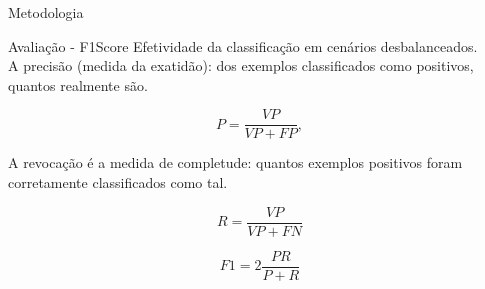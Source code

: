 \documentclass{beamer}
\begin{document}
\begin{frame}{Metodologia}
\begin{block}{Avaliação - F1Score}
\justifying
Efetividade da classificação em cenários desbalanceados. 
\\

A precisão (medida da exatidão): dos exemplos classificados como positivos, quantos realmente são.

\begin{equation}
  P = \frac{VP}{VP + FP},
  \label{precisao}
\end{equation}

A revocação é a medida de completude: quantos exemplos positivos foram corretamente classificados como tal. 

\begin{equation}
  R = \frac{VP}{VP + FN}
  \label{revocacao}
\end{equation}

\begin{equation}
  F1 = 2 \frac{PR}{P+R}
  \label{medidaf}
\end{equation}
\end{block}
\end{frame}
\end{document}
